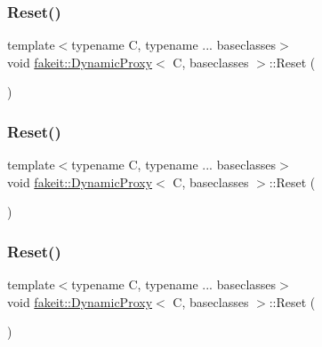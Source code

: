 \subsubsection{\texorpdfstring{Reset()}{Reset()}\hspace{0.1cm}{\footnotesize\ttfamily [1/9]}}
{\footnotesize\ttfamily template$<$typename C, typename ... baseclasses$>$ \\
void \mbox{\hyperlink{structfakeit_1_1DynamicProxy}{fakeit\+::\+Dynamic\+Proxy}}$<$ C, baseclasses $>$\+::Reset (\begin{DoxyParamCaption}{ }\end{DoxyParamCaption})\hspace{0.3cm}{\ttfamily [inline]}}

\mbox{\label{structfakeit_1_1DynamicProxy_a8f00dd7c68a247f715ec3925f662de9f}} 
\subsubsection{\texorpdfstring{Reset()}{Reset()}\hspace{0.1cm}{\footnotesize\ttfamily [2/9]}}
{\footnotesize\ttfamily template$<$typename C, typename ... baseclasses$>$ \\
void \mbox{\hyperlink{structfakeit_1_1DynamicProxy}{fakeit\+::\+Dynamic\+Proxy}}$<$ C, baseclasses $>$\+::Reset (\begin{DoxyParamCaption}{ }\end{DoxyParamCaption})\hspace{0.3cm}{\ttfamily [inline]}}

\mbox{\label{structfakeit_1_1DynamicProxy_a8f00dd7c68a247f715ec3925f662de9f}} 
\subsubsection{\texorpdfstring{Reset()}{Reset()}\hspace{0.1cm}{\footnotesize\ttfamily [3/9]}}
{\footnotesize\ttfamily template$<$typename C, typename ... baseclasses$>$ \\
void \mbox{\hyperlink{structfakeit_1_1DynamicProxy}{fakeit\+::\+Dynamic\+Proxy}}$<$ C, baseclasses $>$\+::Reset (\begin{DoxyParamCaption}{ }\end{DoxyParamCaption})\hspace{0.3cm}{\ttfamily [inline]}}

